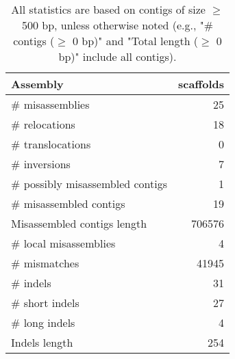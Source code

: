 \documentclass[12pt,a4paper]{article}
\begin{document}
\begin{table}[ht]
\begin{center}
\caption{All statistics are based on contigs of size $\geq$ 500 bp, unless otherwise noted (e.g., "\# contigs ($\geq$ 0 bp)" and "Total length ($\geq$ 0 bp)" include all contigs).}
\begin{tabular}{|l*{1}{|r}|}
\hline
Assembly & scaffolds \\ \hline
\# misassemblies & 25 \\ \hline
\hspace{5mm}\# relocations & 18 \\ \hline
\hspace{5mm}\# translocations & 0 \\ \hline
\hspace{5mm}\# inversions & 7 \\ \hline
\# possibly misassembled contigs & 1 \\ \hline
\# misassembled contigs & 19 \\ \hline
Misassembled contigs length & 706576 \\ \hline
\# local misassemblies & 4 \\ \hline
\# mismatches & 41945 \\ \hline
\# indels & 31 \\ \hline
\hspace{5mm}\# short indels & 27 \\ \hline
\hspace{5mm}\# long indels & 4 \\ \hline
Indels length & 254 \\ \hline
\end{tabular}
\end{center}
\end{table}
\end{document}
